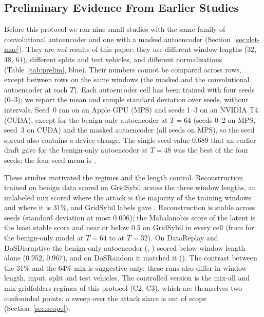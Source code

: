 \subsection{Preliminary Evidence From Earlier Studies}\label{sec:res-prelim}

Before this protocol we ran nine small studies with the same family of convolutional autoencoder and one with a
masked autoencoder (Section~\ref{sec:det-mae}). They are \emph{not} results of this paper: they use different
window lengths (32, 48, 64), different splits and test vehicles, and different normalizations
(Table~\ref{tab:prelim}, blue). Their numbers cannot be compared across rows, except between rows on the same
windows (the masked and the convolutional autoencoder at each $T$). Each autoencoder cell has been trained with
four seeds (0--3); we report the mean and sample standard deviation over seeds, without intervals. Seed~0 ran on
an Apple GPU (MPS) and seeds 1--3 on an NVIDIA T4 (CUDA), except for the benign-only autoencoder at $T=64$
(seeds 0--2 on MPS, seed~3 on CUDA) and the masked autoencoder (all seeds on MPS), so the seed spread also
contains a device change. The single-seed value 0.689 that an earlier draft gave for the benign-only autoencoder
at $T=48$ was the best of the four seeds; the four-seed mean is .

These studies motivated the regimes and the length control. Reconstruction trained on benign data scored
 on GridSybil across the three window lengths, an unlabeled mix scored
 where the attack is the majority of the training windows and  where it is
31\%, and GridSybil labels gave . Reconstruction is stable across seeds (standard deviation
at most 0.006); the Mahalanobis score of the latent is the least stable score and near or below 0.5 on GridSybil in every cell (from  for the
benign-only model at $T=64$ to  at $T=32$). On
DataReplay and DoSDisruptive the benign-only autoencoder (, ) scored below window length alone (0.952, 0.967), and on DoSRandom it matched it (). The contrast between the 31\% and the 64\% mix is suggestive only: these runs also differ in window
length, input, split and test vehicles. The controlled version is the mix-all and mix-gridfolders regimes of this
protocol (C2, C3), which are themselves two confounded points; a sweep over the attack share is out of scope
(Section~\ref{sec:scope}).

